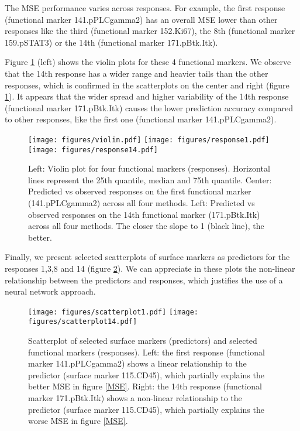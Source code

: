 \documentclass[graybox]{svmult}
\begin{document}
The MSE performance varies across responses. For example, the first response (functional marker 141.pPLCgamma2) has an overall MSE lower than other responses like the third (functional marker 152.Ki67), the 8th (functional marker 159.pSTAT3) or the 14th (functional marker 171.pBtk.Itk).

Figure \ref{violin} (left) shows the violin plots for these 4 functional markers. We observe that the 14th response has a wider range and heavier tails than the other responses, which is confirmed in the scatterplots on the center and right (figure \ref{violin}). It appears that the wider spread and higher variability of the 14th response (functional marker 171.pBtk.Itk) causes the lower prediction accuracy compared to other responses, like the first one (functional marker 141.pPLCgamma2).

\begin{figure}
\centering
\texttt{[image: figures/violin.pdf]} \hspace{0.25cm}
\texttt{[image: figures/response1.pdf]}
\hspace{0.25cm}
\texttt{[image: figures/response14.pdf]}
\caption{Left: Violin plot for four functional markers (responses). Horizontal lines represent the 25th quantile, median and 75th quantile. Center: Predicted vs observed responses on the first functional marker (141.pPLCgamma2)
  across all four methods. Left: Predicted vs observed responses on the 14th functional marker (171.pBtk.Itk)
  across all four methods. The closer the slope to 1 (black line), the
  better.}
\label{violin}
\end{figure}

Finally, we present selected scatterplots of surface markers as predictors for the responses 1,3,8 and 14 (figure
\ref{predObs}). We can appreciate in these plots the non-linear relationship between the predictors and responses, which justifies the use of a neural network approach.

\begin{figure}
\centering
\texttt{[image: figures/scatterplot1.pdf]} \hspace{0.5cm}
\texttt{[image: figures/scatterplot14.pdf]}
\caption{Scatterplot of selected surface markers (predictors) and selected functional markers (responses). Left: the first response (functional marker 141.pPLCgamma2) shows a linear relationship to the predictor (surface marker 115.CD45), which partially explains the better MSE in figure \ref{MSE}. Right: the 14th response (functional marker 171.pBtk.Itk) shows a non-linear relationship to the predictor (surface marker 115.CD45), which partially explains the worse MSE in figure \ref{MSE}.}
\label{predObs}
\end{figure}
\end{document}
